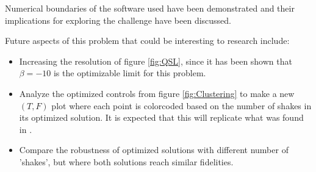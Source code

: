 \documentclass[aps,pra,reprint,superscriptaddress]{revtex4-1}
\begin{document}
Numerical boundaries of the software used have been demonstrated and their implications for exploring the challenge have been discussed.

Future aspects of this problem that could be interesting to research include:
\begin{itemize}
	\item Increasing the resolution of figure \ref{fig:QSL}, since it has been shown that $\beta=-10$ is the optimizable limit for this problem.
	\item Analyze the optimized controls from figure \ref{fig:Clustering} to make a new $(T,F)$ plot where each point is colorcoded based on the number of shakes in its optimized solution. It is expected that this will replicate what was found in \cite{QM2Paper}.
	\item Compare the robustness of optimized solutions with different number of 'shakes', but where both solutions reach similar fidelities.
\end{itemize}


\end{document}
